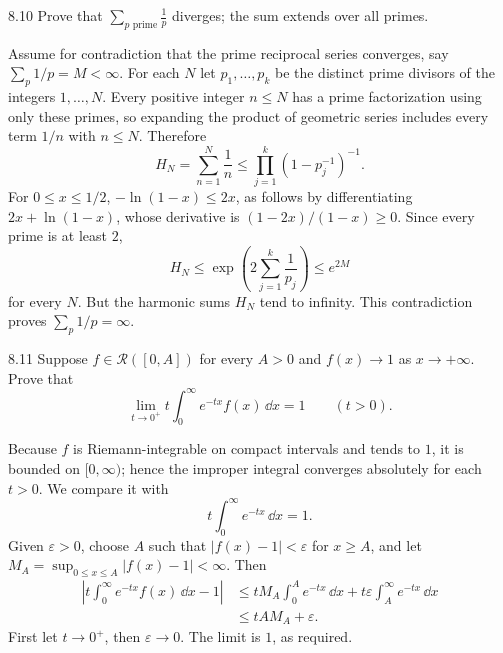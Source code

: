 \documentclass[11pt, oneside]{article}
\begin{document}
\begin{exercise}{8.10}
Prove that $\displaystyle\sum_{p\text{ prime}}\frac1p$ diverges; the sum extends over all primes.
\end{exercise}
\begin{solution}
Assume for contradiction that the prime reciprocal series converges, say $\sum_p1/p=M<\infty$. For each $N$ let $p_1, \ldots, p_k$ be the distinct prime divisors of the integers $1, \ldots, N$. Every positive integer $n\le N$ has a prime factorization using only these primes, so expanding the product of geometric series includes every term $1/n$ with $n\le N$. Therefore
\[
 H_N=\sum_{n=1}^N\frac1n
 \le\prod_{j=1}^k(1-p_j^{-1})^{-1}.
\]
For $0\le x\le1/2$, $-\ln(1-x)\le2x$, as follows by differentiating $2x+\ln(1-x)$, whose derivative is $(1-2x)/(1-x)\ge0$. Since every prime is at least $2$,
\[
 H_N\le\exp\left(2\sum_{j=1}^k\frac1{p_j}\right)\le e^{2M}
\]
for every $N$. But the harmonic sums $H_N$ tend to infinity. This contradiction proves $\sum_p1/p=\infty$.
\end{solution}

\begin{exercise}{8.11}
Suppose $f\in\mathcal{R}([0, A])$ for every $A>0$ and $f(x)\to1$ as $x\to+\infty$. Prove that
\[
 \lim_{t\to0^+}t\int_0^\infty e^{-tx}f(x)\,\dd x=1\qquad(t>0).
\]
\end{exercise}
\begin{solution}
Because $f$ is Riemann-integrable on compact intervals and tends to $1$, it is bounded on $[0, \infty)$; hence the improper integral converges absolutely for each $t>0$. We compare it with
\[
 t\int_0^\infty e^{-tx}\,\dd x=1.
\]
Given $\varepsilon>0$, choose $A$ such that $|f(x)-1|<\varepsilon$ for $x\ge A$, and let $M_A=\sup_{0\le x\le A}|f(x)-1|<\infty$. Then
\[
 \begin{aligned}
 \left|t\int_0^\infty e^{-tx}f(x)\,\dd x-1\right|
 &\le tM_A\int_0^A e^{-tx}\,\dd x
    +t\varepsilon\int_A^\infty e^{-tx}\,\dd x\\
 &\le tAM_A+\varepsilon.
 \end{aligned}
\]
First let $t\to0^+$, then $\varepsilon\to0$. The limit is $1$, as required.
\end{solution}
\end{document}
